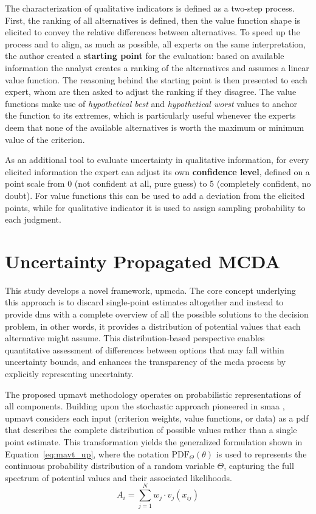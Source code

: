 The characterization of qualitative indicators is defined as a two-step process. First, the ranking of all alternatives is defined, then the value function shape is elicited to convey the relative differences between alternatives. To speed up the process and to align, as much as possible, all experts on the same interpretation, the author created a \textbf{starting point} for the evaluation: based on available information the analyst creates a ranking of the alternatives and assumes a linear value function. The reasoning behind the starting point is then presented to each expert, whom are then asked to adjust the ranking if they disagree. 
The value functions make use of \textit{hypothetical best} and \textit{hypothetical worst} values to anchor the function to its extremes, which is particularly useful whenever the experts deem that none of the available alternatives is worth the maximum or minimum value of the criterion.

As an additional tool to evaluate uncertainty in qualitative information, for every elicited information the expert can adjust its own \textbf{confidence level}, defined on a point scale from 0 (not confident at all, pure guess) to 5 (completely confident, no doubt). For value functions this can be used to add a deviation from the elicited points, while for qualitative indicator it is used to assign sampling probability to each judgment.

\section{Uncertainty Propagated MCDA}
\label{sec:uncertanty_propagation_mcda}

This study develops a novel framework, \gls{upmcda}. The core concept underlying this approach is to discard single-point estimates altogether and instead to provide \glspl{dm} with a complete overview of all the possible solutions to the decision problem, in other words, it provides a distribution of potential values that each alternative might assume. This distribution-based perspective enables quantitative assessment of differences between options that may fall within uncertainty bounds, and enhances the transparency of the \gls{mcda} process by explicitly representing uncertainty.

The proposed \gls{upmavt} methodology operates on probabilistic representations of all components. Building upon the stochastic approach pioneered in \gls{smaa} \cite{LAHDELMA1998137}, \gls{upmavt} considers each input (criterion weights, value functions, or data) as a \gls{pdf} that describes the complete distribution of possible values rather than a single point estimate. This transformation yields the generalized formulation shown in Equation~\ref{eq:mavt_up}, where the notation $\text{PDF}_\Theta(\theta)$ is used to represents the continuous probability distribution of a random variable $\Theta$, capturing the full spectrum of potential values and their associated likelihoods.
\begin{equation}
A_i = \sum_{j=1}^N w_j \cdot v_j(x_{ij})
\label{eq:mavt_standard}
\end{equation}

